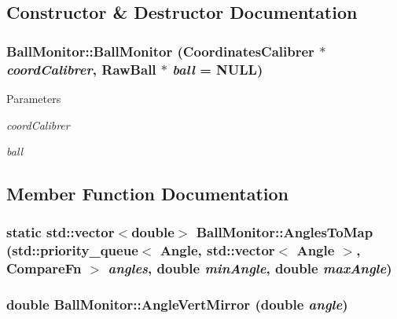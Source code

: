 \subsection{Constructor \& Destructor Documentation}
\hypertarget{classBallMonitor_a176a257973eefa572b6972aa6b5a605d}{
\subsubsection[{BallMonitor}]{\setlength{\rightskip}{0pt plus 5cm}BallMonitor::BallMonitor ({\bf CoordinatesCalibrer} $\ast$ {\em coordCalibrer}, \/  RawBall $\ast$ {\em ball} = {\ttfamily NULL})}}
\label{classBallMonitor_a176a257973eefa572b6972aa6b5a605d}

\begin{DoxyParams}{Parameters}
\item[{\em coordCalibrer}]\item[{\em ball}]\end{DoxyParams}


\subsection{Member Function Documentation}
\hypertarget{classBallMonitor_a8f3198b6b4ef8eb52c0ff04afd33cc8f}{
\subsubsection[{AnglesToMap}]{\setlength{\rightskip}{0pt plus 5cm}static std::vector$<$double$>$ BallMonitor::AnglesToMap (std::priority\_\-queue$<$ {\bf Angle}, std::vector$<$ {\bf Angle} $>$, {\bf CompareFn} $>$ {\em angles}, \/  double {\em minAngle}, \/  double {\em maxAngle})}}
\label{classBallMonitor_a8f3198b6b4ef8eb52c0ff04afd33cc8f}
\hypertarget{classBallMonitor_a32d7b6d877b84c7d7fd9bc9ffe659562}{
\subsubsection[{AngleVertMirror}]{\setlength{\rightskip}{0pt plus 5cm}double BallMonitor::AngleVertMirror (double {\em angle})}}
\label{classBallMonitor_a32d7b6d877b84c7d7fd9bc9ffe659562}

